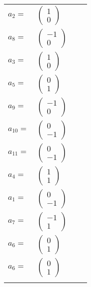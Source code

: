 \documentclass[1p]{elsarticle_modified}
\theoremstyle{definition}
\begin{document}
\begin{tabular}{m{7pt} m{180pt} m{7pt} m{180pt} }
\flushright $a_{2}=$&$\begin{pmatrix}1\\0\end{pmatrix}$ \\
\flushright $a_{8}=$&$\begin{pmatrix}-1\\0\end{pmatrix}$ \\
\flushright $a_{3}=$&$\begin{pmatrix}1\\0\end{pmatrix}$ \\
\flushright $a_{5}=$&$\begin{pmatrix}0\\1\end{pmatrix}$ \\
\flushright $a_{9}=$&$\begin{pmatrix}-1\\0\end{pmatrix}$ \\
\flushright $a_{10}=$&$\begin{pmatrix}0\\-1\end{pmatrix}$ \\
\flushright $a_{11}=$&$\begin{pmatrix}0\\-1\end{pmatrix}$ \\
\flushright $a_{4}=$&$\begin{pmatrix}1\\1\end{pmatrix}$ \\
\flushright $a_{1}=$&$\begin{pmatrix}0\\-1\end{pmatrix}$ \\
\flushright $a_{7}=$&$\begin{pmatrix}-1\\1\end{pmatrix}$ \\
\flushright $a_{6}=$&$\begin{pmatrix}0\\1\end{pmatrix}$\\ \flushright $a_{6}=$&$\begin{pmatrix}0\\1\end{pmatrix}$\\&\end{tabular}
\end{document}
